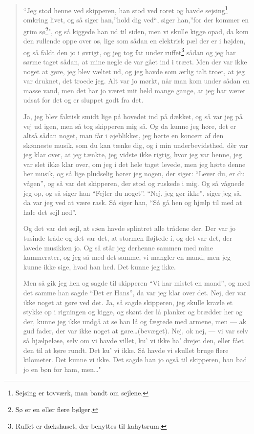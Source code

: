 \begin{quote}
``Jeg stod henne ved skipperen, han stod ved roret og havde
sejsing\footnote{Sejsing er tovværk, man bandt om sejlene.} omkring
livet, og så siger han,''hold dig ved``, siger han,''for der kommer en
grim sø\footnote{Sø er en eller flere bølger.}", og så kiggede han ud
til siden, men vi skulle kigge opad, da kom den rullende oppe over os,
lige som sådan en elektrisk pæl der er i højden, og så faldt den jo i
øvrigt, og jeg tog fat under ruffet\footnote{Ruffet er dækshuset, der
  benyttes til kahytsrum.} sådan og jeg har sørme taget sådan, at mine
negle de var gået ind i træet. Men der var ikke noget at gøre, jeg blev
væltet ud, og jeg havde som ærlig talt troet, at jeg var druknet, det
troede jeg. Alt var jo mørkt, når man kom under sådan en masse vand, men
det har jo været mit held mange gange, at jeg har været udsat for det og
er sluppet godt fra det.

Ja, jeg blev faktisk smidt lige på hovedet ind på dækket, og så var jeg
på vej ud igen, men så tog skipperen mig så. Og da kunne jeg høre, det
er altså sådan noget, man får i øjeblikket, jeg hørte en koncert af den
skønneste musik, som du kan tænke dig, og i min underbevidsthed, dèr var
jeg klar over, at jeg tænkte, jeg vidste ikke rigtig, hvor jeg var
henne, jeg var slet ikke klar over, om jeg i det hele taget levede, men
jeg hørte denne her musik, og så lige pludselig hører jeg nogen, der
siger: ``Lever du, er du vågen'', og så var det skipperen, der stod og
ruskede i mig. Og så vågnede jeg op, og så siger han ``Fejler du
noget''. ``Nej, jeg gør ikke'', siger jeg så, da var jeg ved at være
rask. Så siger han, ``Så gå hen og hjælp til med at hale det sejl ned''.

Og det var det sejl, at søen havde splintret alle trådene der. Der var
jo tusinde tråde og det var det, at stormen fløjtede i, og det var det,
der lavede musikken jo. Og så står jeg derhenne sammen med mine
kammerater, og jeg så med det samme, vi mangler en mand, men jeg kunne
ikke sige, hvad han hed. Det kunne jeg ikke.

Men så gik jeg hen og sagde til skipperen ``Vi har mistet en mand'', og
med det samme han sagde ``Det er Hans'', da var jeg klar over det. Nej,
der var ikke noget at gøre ved det. Ja, så sagde skipperen, jeg skulle
kravle et stykke op i rigningen og kigge, og skønt der lå planker og
brædder her og der, kunne jeg ikke undgå at se han lå og fægtede med
armene, men --- ak gud fader, der var ikke noget at
gøre\ldots (bevæget). Nej, ok nej, --- vi var selv så hjælpeløse, selv
om vi havde villet, ku' vi ikke ha' drejet den, eller fået den til at
køre rundt. Det ku' vi ikke. Så havde vi skullet bruge flere kilometer.
Det kunne vi ikke. Det sagde han jo også til skipperen, han bad jo en
bøn for ham, men\ldots"
\end{quote}

